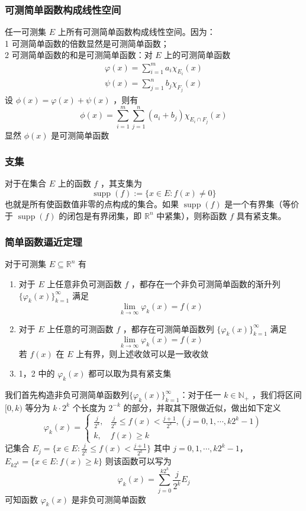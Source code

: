 \documentclass{ctexbook}
\newcommand{\no}{\noindent}
\newcommand{\pro}{\no{\bf 证明：}}
\newcommand{\R}{\mathbb{R}}
\newcommand{\ITEMS}{\begin{enumerate}[leftmargin=4em]}
\newcommand{\ITEME}{\end{enumerate}}
\begin{document}
\subsubsection{可测简单函数构成线性空间}

任一可测集 $E$ 上所有可测简单函数构成线性空间。因为：\\

1 可测简单函数的倍数显然是可测简单函数；\\

2 可测简单函数的和是可测简单函数：对 $E$ 上的可测简单函数
\[
\begin{aligned}
	\varphi (x) = \sum_{i=1}^m a_i \chi_{E_i} (x)\\
	\psi (x) = \sum_{j=1}^n b_j \chi_{F_j} (x)
\end{aligned}
\]
设 $\phi(x) = \varphi(x) + \psi(x)$ ，则有
\[
\phi(x) = \sum_{i=1}^m \sum_{j=1}^n (a_i + b_j) \chi_{E_i \cap F_j}(x)
\]
显然 $\phi(x)$ 是可测简单函数

\subsubsection{支集}

对于在集合 $E$ 上的函数 $f$ ，其支集为
\[
\operatorname{supp}(f) := \{ x \in E : f(x) \ne 0 \}
\]
也就是所有使函数值非零的点构成的集合。如果 $\operatorname{supp}(f)$ 是一个有界集（等价于 $\operatorname{supp}(f)$ 的闭包是有界闭集，即 $\R^n$ 中紧集），则称函数 $f$ 具有紧支集。

\subsubsection{简单函数逼近定理}
对于可测集 $E \subseteq \R ^n$ 有
\ITEMS
\item 对于 $E$ 上任意非负可测函数 $f$ ，都存在一个非负可测简单函数的渐升列 $\{\varphi_k(x)\}_{k=1} ^\infty$ 满足
\[
\lim_{k\to\infty} \varphi_k(x) = f(x)
\]

\item 对于 $E$ 上任意的可测函数 $f$ ，都存在可测简单函数列 $\{\varphi_k(x)\}_{k=1} ^\infty$ 满足
\[
\lim_{k\to\infty} \varphi_k(x) = f(x)
\]
若 $f(x)$ 在 $E$ 上有界，则上述收敛可以是一致收敛

\item 1，2 中的 $\varphi_k(x)$ 都可以取为具有紧支集 
\ITEME 

\pro 

我们首先构造非负可测简单函数列$\{\varphi_k(x)\}_{k=1} ^\infty$：对于任一 $k \in \mathbb{N} _+$ ，我们将区间 $[0,k)$ 等分为 $k \cdot 2^k$ 个长度为 $2^{-k}$ 的部分，并取其下限做近似，做出如下定义
\[
\varphi_k(x) = \begin{cases}
	\frac{j}{2^k}, & \frac{j}{2^k} \le f(x) < \frac{j+1}{2^k} ,(j = 0,1,\cdots, k2^k -1)\\
	k , &f(x) \ge k 
\end{cases}
\]
记集合 $E_j = \{x\in E: \frac{j}{2^k} \le f(x) < \frac{j+1}{2^k}\}$ 其中 $j = 0,1,\cdots, k2^k -1$，$E_{k2^k} = \{x\in E: f(x) \ge k\}$ 则该函数可以写为
\[
\varphi_k(x) = \sum_{j = 0} ^{k2^k} \frac{j}{2^k} E_j
\]
可知函数 $\varphi_k(x)$ 是非负可测简单函数
\end{document}

